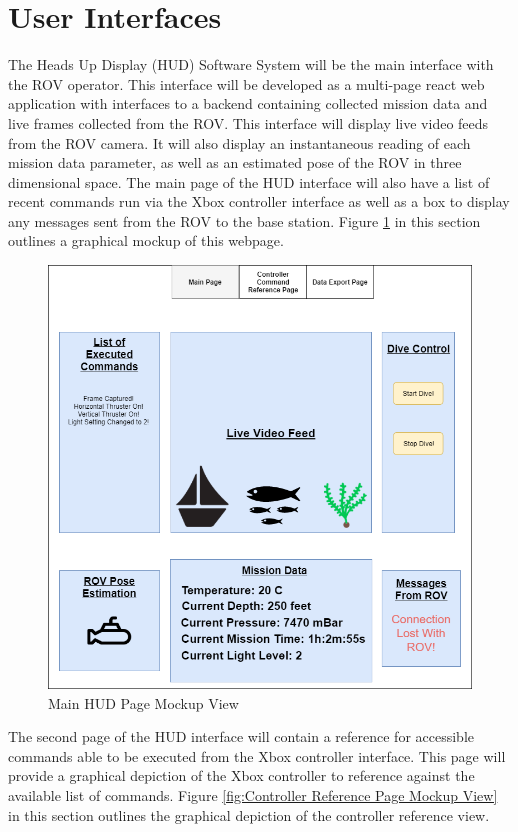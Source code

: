 \documentclass{scrreprt}
\begin{document}
\section{User Interfaces}
The Heads Up Display (HUD) Software System will be the main interface with the ROV operator. This interface will be developed as a multi-page react web application with interfaces to a backend containing collected mission data and live frames collected from the ROV. This interface will display live video feeds from the ROV camera. It will also display an instantaneous reading of each mission data parameter, as well as an estimated pose of the ROV in three dimensional space. The main page of the HUD interface will also have a list of recent commands run via the Xbox controller interface as well as a box to display any messages sent from the ROV to the base station. Figure \ref{fig:Main HUD Page Mockup View} in this section outlines a graphical mockup of this webpage.

\begin{figure}[!ht]
    \centering
    \includegraphics[scale=0.45]{MainPageHUDMockup.png}
    \caption{Main HUD Page Mockup View}
    \label{fig:Main HUD Page Mockup View}
\end{figure}
\FloatBarrier

The second page of the HUD interface will contain a reference for accessible commands able to be executed from the Xbox controller interface. This page will provide a graphical depiction of the Xbox controller to reference against the available list of commands. Figure \ref{fig:Controller Reference Page Mockup View} in this section outlines the graphical depiction of the controller reference view. 
\end{document}
